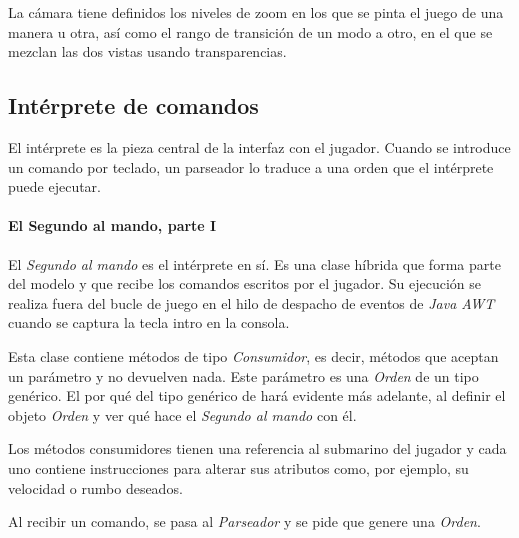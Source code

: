 \documentclass[a4paper,
	11pt,
	parskip=full,
	bibliography=totoc,
	twoside
	]{scrartcl}
\begin{document}
			La cámara tiene definidos los niveles de zoom en los que se pinta el juego de una manera u otra, así como el rango de transición de un modo a otro, en el que se mezclan las dos vistas usando transparencias.
	
	\subsection{Intérprete de comandos}
	\label{subsec:interprete_comandos}
		El intérprete es la pieza central de la interfaz con el jugador. Cuando se introduce un comando por teclado, un parseador lo traduce a una orden que el intérprete puede ejecutar. \cite{codementor_method_reference, freecode_lambda, baeldung_lambda, so_runnable}
		
		\paragraph{El Segundo al mando, parte I}
			El \textit{Segundo al mando} es el intérprete en sí. Es una clase híbrida que forma parte del modelo y que recibe los comandos escritos por el jugador. Su ejecución se realiza fuera del bucle de juego en el hilo de despacho de eventos de \textit{Java AWT} \cite{java_dispatch, baeldung_concurrent} cuando se captura la tecla intro en la consola.
			
			Esta clase contiene métodos de tipo \textit{Consumidor}, es decir, métodos que aceptan un parámetro y no devuelven nada. Este parámetro es una \textit{Orden} de un tipo genérico. El por qué del tipo genérico de hará evidente más adelante, al definir el objeto \textit{Orden} y ver qué hace el \textit{Segundo al mando} con él.
			
			Los métodos consumidores tienen una referencia al submarino del jugador y cada uno contiene instrucciones para alterar sus atributos como, por ejemplo, su velocidad o rumbo deseados.
			
			Al recibir un comando, se pasa al \textit{Parseador} y se pide que genere una \textit{Orden}.
			
\end{document}

